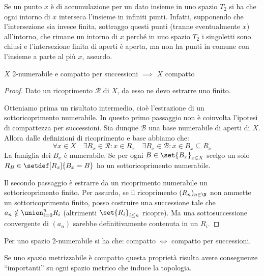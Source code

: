\begin{oss}
	Se un punto $x$ è di accumulazione per un dato insieme in uno spazio $T_2$ si ha che ogni intorno di $x$ interseca l'insieme in infiniti punti.
	Infatti, supponendo che l'intersezione sia invece finita, sottraggo questi punti (tranne eventualmente $x$) all'intorno, che rimane un intorno di $x$ perché in uno spazio $T_2$ i singoletti sono chiusi e l'intersezione finita di aperti è aperta, ma non ha punti in comune con l'insieme a parte al più $x$, assurdo.
\end{oss}

\begin{prop}
	$X$ 2-numerabile e compatto per successioni $\implies$ $X$ compatto
\end{prop}

\begin{proof}
	Dato un ricoprimento $\mathcal R$ di $X$, da esso ne devo estrarre uno finito.
	
	Otteniamo prima un risultato intermedio, cioè l'estrazione di un sottoricoprimento numerabile.
	In questo primo passaggio non è coinvolta l'ipotesi di compattezza per successioni.
	Sia dunque $\mathcal B$ una base numerabile di aperti di $X$.
	Allora dalle definizioni di ricoprimento e base abbiamo che:
	\[\forall x\in X \quad
	\exists R_x \in \mathcal R : x\in R_x \quad
	\exists B_x \in \mathcal B : x\in B_x \subseteq R_x\]
	La famiglia dei $B_x$ è numerabile. Se per ogni $B\in\set{B_x}_{x\in X}$ scelgo un solo $R_B\in\setdef[R_x]{B_x=B}$ ho un sottoricoprimento numerabile.
	
	Il secondo passaggio è estrarre da un ricoprimento numerabile un sottoricoprimento finito.
	Per assurdo, se il ricoprimento $(R_n)_{n\in \N}$ non ammette un sottoricoprimento finito, posso costruire una successione tale che $a_n\notin\union_{i=0}^nR_i$ (altrimenti $\set{R_i}_{i\le n}$ ricopre).
	Ma una sottosuccessione convergente di $(a_n)$ sarebbe definitivamente contenuta in un $R_i$.
\end{proof}

\begin{cor}
	Per uno spazio 2-numerabile si ha che: compatto $\iff$ compatto per successioni.
\end{cor}


Se uno spazio metrizzabile è compatto questa proprietà risulta avere conseguenze ``importanti'' su ogni spazio metrico che induce la topologia.

